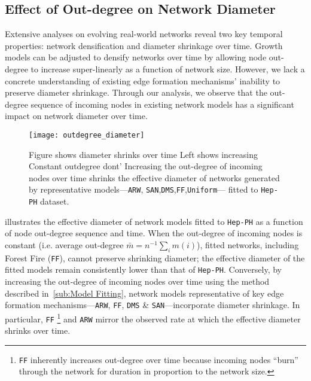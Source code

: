 \subsection{Effect of Out-degree on Network Diameter}
Extensive analyses \cite{hu2009evolution,mcglohon2011statistical,leskovec2005graphs} on evolving
real-world networks reveal two key temporal properties: network densification and diameter
shrinkage over time. Growth models can be adjusted to densify networks over time
by allowing node out-degree to increase super-linearly as a
function of network size. However, we lack a concrete understanding of existing
edge formation mechanisms' inability to preserve diameter shrinkage. Through our
analysis, we observe that the out-degree sequence of incoming nodes in existing
network models has a significant impact on network diameter over time.
\begin{figure}[H]
 \vspace{-10pt}
 \centering
 \texttt{[image: outdegree\_diameter]}
 \caption{
 Figure shows diameter shrinks over time
 Left shows increasing
 Constant outdegree dont'
    Increasing the out-degree of incoming nodes over time shrinks the effective
    diameter of networks generated by representative models---\texttt{ARW},
    \texttt{SAN},\texttt{DMS},\texttt{FF},\texttt{Uniform}--- fitted to \texttt{Hep-PH} dataset.
 }
 \label{fig:diameter}
 \vspace{-10pt}
\end{figure}
 illustrates the effective diameter of network models fitted
to \texttt{Hep-PH} as a function of node out-degree sequence and time. When
the out-degree of incoming nodes is constant (i.e. average out-degree $\bar{m}=n^{-1}\sum_i m(i)$), fitted networks, including Forest Fire (\texttt{FF}), cannot preserve
shrinking diameter; the effective diameter of the fitted models remain
consistently lower than that of \texttt{Hep-PH}. Conversely, by increasing the
out-degree of incoming nodes over time using the method described
in~\cref{sub:Model Fitting}, network models representative of key edge formation
mechanisms---\texttt{ARW}, \texttt{FF}, \texttt{DMS} \&
\texttt{SAN}---incorporate diameter shrinkage. In particular,
\texttt{FF} \footnote{\texttt{FF} inherently increases out-degree over time
because incoming nodes ``burn'' through the network for duration in proportion
to the network size.} and \texttt{ARW} mirror the observed rate at which the
effective diameter shrinks over time.

